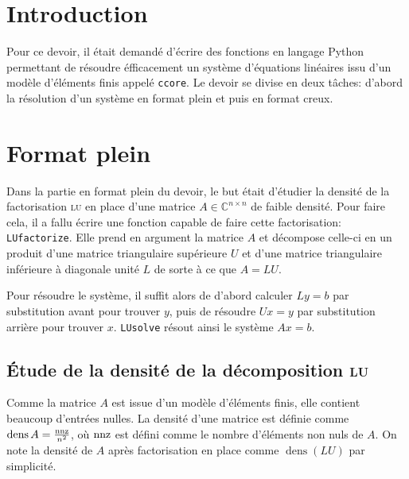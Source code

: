 \documentclass[11pt]{article}
\DeclareMathOperator{\dens}{\mathrm{dens}}
\begin{document}
\section*{Introduction}
Pour ce devoir, il était demandé d'écrire des fonctions en langage Python permettant de résoudre éfficacement un système d'équations linéaires issu d'un modèle d'éléments finis appelé \lstinline[language=bash]{ccore}.
Le devoir se divise en deux tâches: d'abord la résolution d'un système en format plein et puis en format creux.

\section{Format plein}
\label{sec:dense}
Dans la partie en format plein du devoir, le but était d'étudier la densité de la factorisation \textsc{lu} en place d'une matrice $A \in \mathbb{C}^{n \times n}$ de faible densité.
Pour faire cela, il a fallu écrire une fonction capable de faire cette factorisation: \lstinline|LUfactorize|.
Elle prend en argument la matrice $A$ et décompose celle-ci en un produit d'une matrice triangulaire supérieure $U$ et d'une matrice triangulaire inférieure à diagonale unité $L$ de sorte à ce que $A = LU$.

Pour résoudre le système, il suffit alors de d'abord calculer $Ly = b$ par substitution avant pour trouver $y$, puis de résoudre $Ux = y$ par substitution arrière pour trouver $x$.
\lstinline|LUsolve| résout ainsi le système $Ax = b$.
\subsection{Étude de la densité de la décomposition \textsc{lu}}
\label{sec:fulldens}
Comme la matrice $A$ est issue d'un modèle d'éléments finis, elle contient beaucoup d'entrées nulles.
La densité d'une matrice est définie comme $ \dens A  = \frac{\textnormal{nnz}}{n^2}$, où $\textnormal{nnz}$ est défini comme le nombre d'éléments non nuls de $A$. On note la densité de $A$ après factorisation en place comme $\dens(LU)$ par simplicité.
\end{document}
